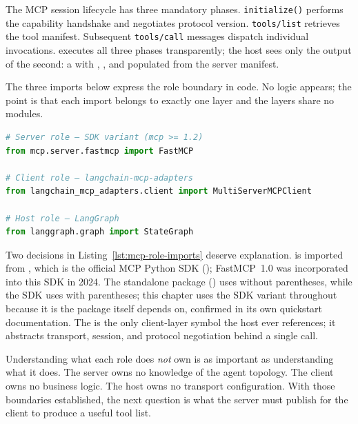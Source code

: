 \begin{notebox}
The MCP session lifecycle has three mandatory phases.
\texttt{initialize()} performs the capability handshake and negotiates
protocol version. \texttt{tools/list} retrieves the tool manifest.
Subsequent \texttt{tools/call} messages dispatch individual invocations.
 executes all three phases transparently;
the host sees only the output of the second: a 
with , , and  populated
from the server manifest.
\end{notebox}

The three imports below express the role boundary in code.
No logic appears; the point is that each import belongs to exactly one
layer and the layers share no modules.

\begin{lstlisting}[language=Python,
                   caption={One import per MCP role},
                   label={lst:mcp-role-imports}]
# Server role — SDK variant (mcp >= 1.2)
from mcp.server.fastmcp import FastMCP

# Client role — langchain-mcp-adapters
from langchain_mcp_adapters.client import MultiServerMCPClient

# Host role — LangGraph
from langgraph.graph import StateGraph
\end{lstlisting}

Two decisions in Listing~\ref{lst:mcp-role-imports} deserve explanation.
 is imported from , which is the
official MCP Python SDK (); FastMCP~1.0 was
incorporated into this SDK in 2024.
The standalone  package () uses
 without parentheses, while the SDK uses 
with parentheses; this chapter uses the SDK variant throughout because it
is the package  itself depends on, confirmed
in its own quickstart documentation.
The  is the only client-layer symbol the host
ever references; it abstracts transport, session, and protocol negotiation
behind a single  call.

Understanding what each role does \emph{not} own is as important as
understanding what it does. The server owns no knowledge of the agent
topology. The client owns no business logic. The host owns no transport
configuration. With those boundaries established, the next question is
what the server must publish for the client to produce a useful tool list.

